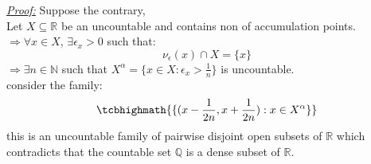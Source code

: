 \documentclass{book}
\begin{document}

\begin{tcolorbox}[enhanced,attach boxed title to top center={yshift=-3mm,yshifttext=-1mm},
colback=blue!5!white,colframe=blue!75!black,colbacktitle=red!80!black,
title=Exercise 38.5(c):,fonttitle=\bfseries,
boxed title style={size=small,colframe=red!50!black} ]
\textit{\color{blue}\underline{Proof:}} Suppose the contrary,\\
Let $X\subseteq\mathbb{R}$ be an uncountable and contains non of accumulation points.\\
$\Rightarrow\forall x\in X$, $\exists \epsilon_x>0$ such that:
$$\nu_\epsilon (x)\cap X=\{x\}$$
$\Rightarrow\exists n\in \mathbb{N}$ such that $X^\alpha=\{x\in X: \epsilon_x>\frac{1}{n}\}$ is uncountable.\\
consider the family:
$$\tcbhighmath{\{(x-\frac{1}{2n},x+\frac{1}{2n}):x\in X^\alpha\}}$$
this is an uncountable family of pairwise disjoint open subsets of $\mathbb{R}$ which contradicts that the 
countable set $\mathbb{Q}$ is a dense subset of
$\mathbb{R}$.

\end{tcolorbox}

\end{document}

